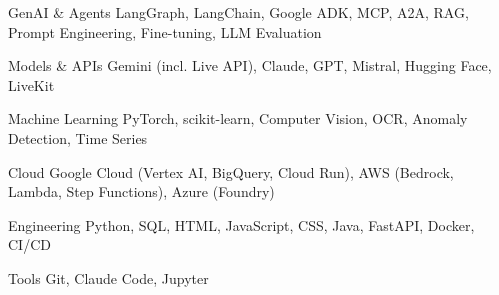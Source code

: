 

\begin{cvskills}

  \cvskill
    {GenAI \& Agents} %
    {LangGraph, LangChain, Google ADK, MCP, A2A, RAG, Prompt Engineering, Fine-tuning, LLM Evaluation} %

  \cvskill
    {Models \& APIs} %
    {Gemini (incl. Live API), Claude, GPT, Mistral, Hugging Face, LiveKit} %

  \cvskill
    {Machine Learning} %
    {PyTorch, scikit-learn, Computer Vision, OCR, Anomaly Detection, Time Series} %

  \cvskill
    {Cloud} %
    {Google Cloud (Vertex AI, BigQuery, Cloud Run), AWS (Bedrock, Lambda, Step Functions), Azure (Foundry)} %

  \cvskill
    {Engineering} %
    {Python, SQL, HTML, JavaScript, CSS, Java, FastAPI, Docker, CI/CD} %

  \cvskill
    {Tools} %
    {Git, Claude Code, Jupyter} %

\end{cvskills}
